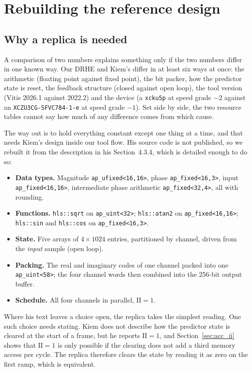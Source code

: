 \section{Rebuilding the reference design}
\label{sec:replica}

\subsection{Why a replica is needed}

A comparison of two numbers explains something only if the two numbers differ
in one known way. Our DRHE and Kiem's differ in at least six ways at once: the
arithmetic (floating point against fixed point), the bit packer, how the
predictor state is reset, the feedback structure (closed against open loop),
the tool version (Vitis 2026.1 against 2022.2) and the device (a
\texttt{xcku5p} at speed grade $-2$ against an \texttt{XCZU3CG-SFVC784-1-e} at
speed grade $-1$). Set side by side, the two resource tables cannot say how
much of any difference comes from which cause.

The way out is to hold everything constant except one thing at a time, and that
needs Kiem's design inside our tool flow. His source code is not published, so
we rebuilt it from the description in his Section~4.3.4, which is detailed
enough to do so:

\begin{itemize}
\item \textbf{Data types.} Magnitude \texttt{ap\_ufixed<16,16>}, phase
\texttt{ap\_fixed<16,3>}, input \texttt{ap\_fixed<16,16>}, intermediate phase
arithmetic \texttt{ap\_fixed<32,4>}, all with rounding.
\item \textbf{Functions.} \texttt{hls::sqrt} on \texttt{ap\_uint<32>};
\texttt{hls::atan2} on \texttt{ap\_fixed<16,16>}; \texttt{hls::sin} and
\texttt{hls::cos} on \texttt{ap\_fixed<16,3>}.
\item \textbf{State.} Five arrays of $4 \times 1024$ entries, partitioned by
channel, driven from the \emph{input} sample (open loop).
\item \textbf{Packing.} The real and imaginary codes of one channel packed
into one \texttt{ap\_uint<58>}; the four channel words then combined into the
256-bit output buffer.
\item \textbf{Schedule.} All four channels in parallel, $\mathrm{II} = 1$.
\end{itemize}

\noindent
Where his text leaves a choice open, the replica takes the simplest reading.
One such choice needs stating. Kiem does not describe how the predictor state
is cleared at the start of a frame, but he reports $\mathrm{II} = 1$, and
Section~\ref{sec:acc_ii} shows that $\mathrm{II} = 1$ is only possible if the
clearing does not add a third memory access per cycle. The replica therefore
clears the state by reading it as zero on the first ramp, which is equivalent.

